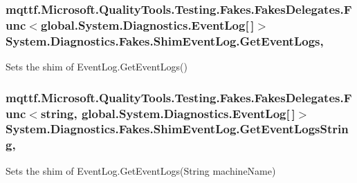 \hypertarget{class_system_1_1_diagnostics_1_1_fakes_1_1_shim_event_log_abc836178c8a237d53a02a7a92937165d}{
\subsubsection[{Get\-Event\-Logs}]{\setlength{\rightskip}{0pt plus 5cm}mqttf.\-Microsoft.\-Quality\-Tools.\-Testing.\-Fakes.\-Fakes\-Delegates.\-Func$<$global.\-System.\-Diagnostics.\-Event\-Log\mbox{[}$\,$\mbox{]}$>$ System.\-Diagnostics.\-Fakes.\-Shim\-Event\-Log.\-Get\-Event\-Logs\hspace{0.3cm}{\ttfamily [static]}, {\ttfamily [set]}}}\label{class_system_1_1_diagnostics_1_1_fakes_1_1_shim_event_log_abc836178c8a237d53a02a7a92937165d}


Sets the shim of Event\-Log.\-Get\-Event\-Logs()

\hypertarget{class_system_1_1_diagnostics_1_1_fakes_1_1_shim_event_log_a605ef385524299e6546491565e285c40}{
\subsubsection[{Get\-Event\-Logs\-String}]{\setlength{\rightskip}{0pt plus 5cm}mqttf.\-Microsoft.\-Quality\-Tools.\-Testing.\-Fakes.\-Fakes\-Delegates.\-Func$<$string, global.\-System.\-Diagnostics.\-Event\-Log\mbox{[}$\,$\mbox{]}$>$ System.\-Diagnostics.\-Fakes.\-Shim\-Event\-Log.\-Get\-Event\-Logs\-String\hspace{0.3cm}{\ttfamily [static]}, {\ttfamily [set]}}}\label{class_system_1_1_diagnostics_1_1_fakes_1_1_shim_event_log_a605ef385524299e6546491565e285c40}


Sets the shim of Event\-Log.\-Get\-Event\-Logs(\-String machine\-Name)

